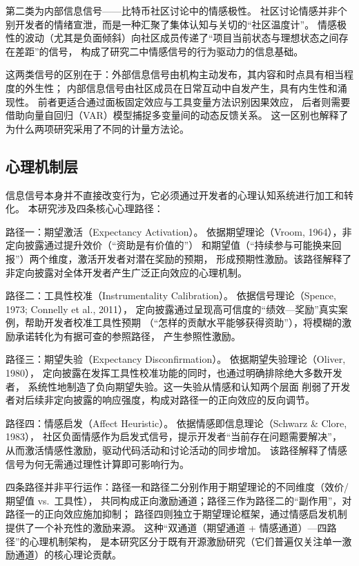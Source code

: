 \documentclass[
    type = master, %
    degree = professional,        %
    decl-page,  %
    twoside,                %
    fontset = fandol %
  ]{njuthesis}
\begin{document}
第二类为内部信息信号——比特币社区讨论中的情感极性。
社区讨论情感并非个别开发者的情绪宣泄，而是一种汇聚了集体认知与关切的``社区温度计''。
情感极性的波动（尤其是负面倾斜）向社区成员传递了``项目当前状态与理想状态之间存在差距''的信号，
构成了研究二中情感信号的行为驱动力的信息基础。

这两类信号的区别在于：外部信息信号由机构主动发布，其内容和时点具有相当程度的外生性；
内部信息信号由社区成员在日常互动中自发产生，具有内生性和涌现性。
前者更适合通过面板固定效应与工具变量方法识别因果效应，
后者则需要借助向量自回归（VAR）模型捕捉多变量间的动态反馈关系。
这一区别也解释了为什么两项研究采用了不同的计量方法论。

\subsection{心理机制层}

信息信号本身并不直接改变行为，它必须通过开发者的心理认知系统进行加工和转化。
本研究涉及四条核心心理路径：

路径一：期望激活（Expectancy Activation）。
依据期望理论（Vroom, 1964）\cite{vroom1964work}，非定向披露通过提升效价（``资助是有价值的''）
和期望值（``持续参与可能换来回报''）两个维度，激活开发者对潜在奖励的预期，
形成预期性激励。该路径解释了非定向披露对全体开发者产生广泛正向效应的心理机制。

路径二：工具性校准（Instrumentality Calibration）。
依据信号理论（Spence, 1973; Connelly et al., 2011）\cite{spence1973job,connelly2011signaling}，
定向披露通过呈现高可信度的``绩效—奖励''真实案例，帮助开发者校准工具性预期
（``怎样的贡献水平能够获得资助''），将模糊的激励承诺转化为有据可查的参照路径，
产生参照性激励。

路径三：期望失验（Expectancy Disconfirmation）。
依据期望失验理论（Oliver, 1980）\cite{oliver1980cognitive}，
定向披露在发挥工具性校准功能的同时，也通过明确排除绝大多数开发者，
系统性地制造了负向期望失验。这一失验从情感和认知两个层面
削弱了开发者对后续非定向披露的响应强度，构成对路径一的正向效应的反向调节。

路径四：情感启发（Affect Heuristic）。
依据情感即信息理论（Schwarz \& Clore, 1983）\cite{schwarz1983moods}，
社区负面情感作为启发式信号，提示开发者``当前存在问题需要解决''，
从而激活情感性激励，驱动代码活动和讨论活动的同步增加。
该路径解释了情感信号为何无需通过理性计算即可影响行为。

四条路径并非平行运作：路径一和路径二分别作用于期望理论的不同维度（效价/期望值 vs.\ 工具性），
共同构成正向激励通道；路径三作为路径二的``副作用''，对路径一的正向效应施加抑制；
路径四则独立于期望理论框架，通过情感启发机制提供了一个补充性的激励来源。
这种``双通道（期望通道 + 情感通道）—四路径''的心理机制架构，
是本研究区分于既有开源激励研究（它们普遍仅关注单一激励通道）的核心理论贡献。
\end{document}
